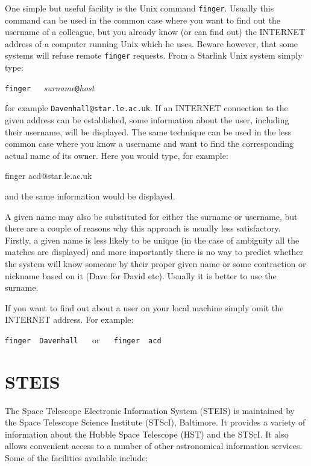 \documentclass[twoside,11pt,nolof]{starlink}
\begin{document}
One simple but useful facility is the Unix command \texttt{finger}. Usually
this command can be used in the common case where you want to find out
the username of a colleague, but you already know (or can find out) the
INTERNET address of a computer running Unix which he uses. Beware
however, that some systems will refuse remote \texttt{finger} requests.
From a Starlink Unix system simply type:

\vspace{2.0 mm}
\texttt{finger ~ }\textit{surname}\texttt{@}\textit{host}
\vspace{2.0 mm}

for example \texttt{Davenhall@star.le.ac.uk}. If an INTERNET connection
to the given address can be established, some information about the
user, including their username, will be displayed.  The same technique
can be used in the less common case where you know a username and want
to find the corresponding actual name of its owner. Here you would
type, for example:

\begin{terminalv}
finger  acd@star.le.ac.uk
\end{terminalv}

and the same information would be displayed.

A given name may also be substituted for either the surname or
username, but there are a couple of reasons why this approach is usually
less satisfactory. Firstly, a given name is less likely to be unique
(in the case of ambiguity all the matches are displayed) and more
importantly there is no way to predict whether the system will know
someone by their proper given name or some contraction or nickname
based on it (Dave for David etc). Usually it is better to use the
surname.

If you want to find out about a user on your local machine simply omit
the INTERNET address. For example:

\vspace{2.0 mm}
\verb:finger  Davenhall: ~~ or ~~ \verb:finger  acd:
\vspace{2.0 mm}


\section{STEIS
\label{STEIS}}

The Space Telescope Electronic Information System (STEIS) is maintained
by the Space Telescope Science Institute (STScI), Baltimore. It provides
a variety of information about the Hubble Space Telescope (HST) and the
STScI. It also allows convenient access to a number of other
astronomical information services. Some of the facilities available
include:
\end{document}
